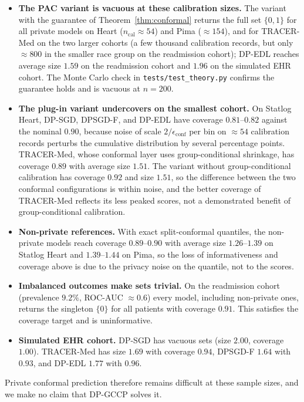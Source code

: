 \documentclass[pdflatex,sn-vancouver-num,referee,lineno]{sn-jnl}
\theoremstyle{thmstyleone}
\theoremstyle{thmstylethree}
\begin{document}
\begin{itemize}
    \item \textbf{The PAC variant is vacuous at these calibration sizes.} The variant with the guarantee of Theorem~\ref{thm:conformal} returns the full set $\{0,1\}$ for all private models on Heart ($n_{\text{cal}}\approx 54$) and Pima ($\approx 154$), and for TRACER-Med on the two larger cohorts (a few thousand calibration records, but only $\approx 800$ in the smaller race group on the readmission cohort); DP-EDL reaches average size $1.59$ on the readmission cohort and $1.96$ on the simulated EHR cohort. The Monte Carlo check in \texttt{tests/test\_theory.py} confirms the guarantee holds and is vacuous at $n=200$.
    \item \textbf{The plug-in variant undercovers on the smallest cohort.} On Statlog Heart, DP-SGD, DPSGD-F, and DP-EDL have coverage $0.81$--$0.82$ against the nominal $0.90$, because noise of scale $2/\epsilon_{\text{conf}}$ per bin on $\approx 54$ calibration records perturbs the cumulative distribution by several percentage points. TRACER-Med, whose conformal layer uses group-conditional shrinkage, has coverage $0.89$ with average size $1.51$. The variant without group-conditional calibration has coverage $0.92$ and size $1.51$, so the difference between the two conformal configurations is within noise, and the better coverage of TRACER-Med reflects its less peaked scores, not a demonstrated benefit of group-conditional calibration.
    \item \textbf{Non-private references.} With exact split-conformal quantiles, the non-private models reach coverage $0.89$--$0.90$ with average size $1.26$--$1.39$ on Statlog Heart and $1.39$--$1.44$ on Pima, so the loss of informativeness and coverage above is due to the privacy noise on the quantile, not to the scores.
    \item \textbf{Imbalanced outcomes make sets trivial.} On the readmission cohort (prevalence $9.2\%$, ROC-AUC $\approx 0.6$) every model, including non-private ones, returns the singleton $\{0\}$ for all patients with coverage $0.91$. This satisfies the coverage target and is uninformative.
    \item \textbf{Simulated EHR cohort.} DP-SGD has vacuous sets (size $2.00$, coverage $1.00$). TRACER-Med has size $1.69$ with coverage $0.94$, DPSGD-F $1.64$ with $0.93$, and DP-EDL $1.77$ with $0.96$.
\end{itemize}
Private conformal prediction therefore remains difficult at these sample sizes, and we make no claim that DP-GCCP solves it.
\end{document}
